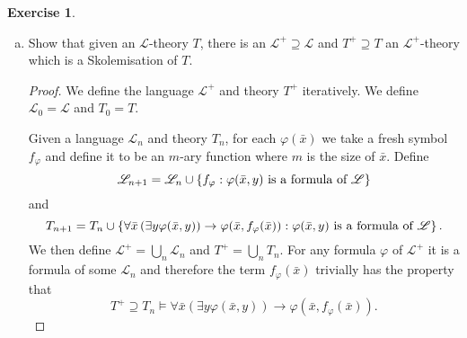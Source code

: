 \documentclass{article}
\newcommand{\setwith}[2]{\left\{#1:#2\right\}}
\newcommand{\lang}{\mathscr{L}}
\theoremstyle{definition}
\newtheorem{question}{Exercise}
\begin{document}
\begin{question}
\begin{enumerate}[(a)]
              \begin{proof}
                  We prove this by showing any substructure satisfies Vaught's
                  test. Let \(M\subseteq N\) be a substructure and
                  \(\varphi(y)\in\lang_{M}\). Then there is a term \(t\) such
                  that \(\exists y\varphi(y)\) is equivalent to
                  \(\varphi^{*}(t)\) by the previous proof\footnote{We just
                      treat the constants from \(M\) as free variables and proceed
                      as in part \(a\).}. Then \(t\) only has constants
                  corresponding to elements of \(M\) so \(t\) corresponds to an
                  element \(m\) of \(M\) by simply evaluating the term \(t\) in
                  \(M\). Then \(N\models\exists y\varphi(y)\) iff
                  \(N\models\varphi^{*}(t)\) which is in turn equivalent to
                  \(N\models\varphi(m)\) because \(N\) agrees with \(M\) on the
                  new constants.
              \end{proof}

        \item Show that given an \(\lang\)-theory \(T\), there is an
              \(\lang^{+}\supseteq\lang\) and \(T^{+}\supseteq T\) an
              \(\lang^{+}\)-theory which is a Skolemisation of \(T\).

              \begin{proof}
                  We define the language \(\lang^{+}\) and theory \(T^{+}\)
                  iteratively. We define \(\lang_{0}=\lang\) and \(T_{0}=T\).

                  Given a language \(\lang_{n}\) and theory \(T_{n}\), for each
                  \(\varphi(\bar{x})\) we take a fresh symbol \(f_{\varphi}\)
                  and define it to be an \(m\)-ary function where \(m\) is the
                  size of \(\bar{x}\). Define
                  \[
                      \lang_{n+1}=\lang_{n}\cup\setwith{f_{\varphi}}{\textnormal{\(\varphi(\bar{x},y)\) is a formula of \(\lang\)}}
                  \]
                  and
                  \[
                      T_{n+1}=T_{n}\cup
                      \setwith{\forall\bar{x}\left(\exists y\varphi(\bar{x},y)\right)\to\varphi(\bar{x},f_{\varphi}(\bar{x}))}
                      {\textnormal{\(\varphi(\bar{x},y)\) is a formula of \(\lang\)}}.
                  \]
                  We then define \(\lang^{+}=\bigcup_{n}\lang_{n}\) and
                  \(T^{+}=\bigcup_{n}T_{n}\). For any formula \(\varphi\) of
                  \(\lang^{+}\) it is a formula of some \(\lang_{n}\) and
                  therefore the term \(f_{\varphi}(\bar{x})\) trivially has the
                  property that
                  \[
                      T^{+}\supseteq T_{n}\models\forall\bar{x}\left(\exists y\varphi(\bar{x},y)\right)\to\varphi(\bar{x},f_{\varphi}(\bar{x})).
                  \]


\end{proof}
\end{enumerate}
\end{question}
\end{document}
